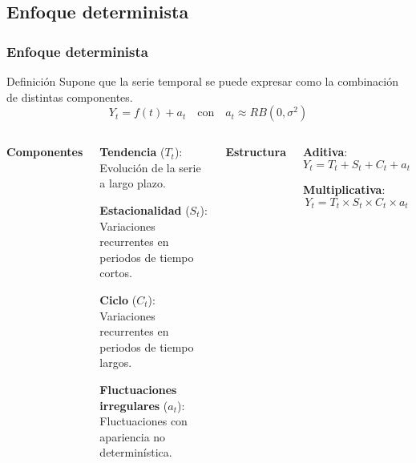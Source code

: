 \documentclass[10pt,a4paper,twoside]{beamer}
\begin{document}
\subsection{Enfoque determinista}


\begin{frame}
\frametitle{Enfoque determinista}

\begin{block}{Definición}
Supone que la serie temporal se puede expresar como la combinación de distintas componentes.
\begin{equation*}
    Y_{t} = f(t) + a_t \quad \text{con} \quad a_t \approx RB(0, \sigma^2)
\end{equation*}
\end{block}
\vspace{.5cm}
\begin{columns}[c]
\textbf{Componentes}
\begin{itemize*}
\item \textbf{Tendencia} ($T_t$): Evolución de la serie a largo plazo.
\item \textbf{Estacionalidad} ($S_t$): Variaciones recurrentes en periodos de tiempo cortos.
\item \textbf{Ciclo} ($C_t$): Variaciones recurrentes en periodos de tiempo largos.
\item \textbf{Fluctuaciones irregulares} ($a_t$): Fluctuaciones con apariencia no determinística.
\end{itemize*}

\textbf{Estructura}
\begin{itemize*}
\item \textbf{Aditiva}:
      \begin{equation*}
        Y_t = T_t + S_t + C_t + a_t
      \end{equation*}
\item \textbf{Multiplicativa}:
      \begin{equation*}
        Y_t = T_t \times S_t \times C_t \times a_t
      \end{equation*}
\end{itemize*}
\end{columns}

\end{frame}

\end{document}
